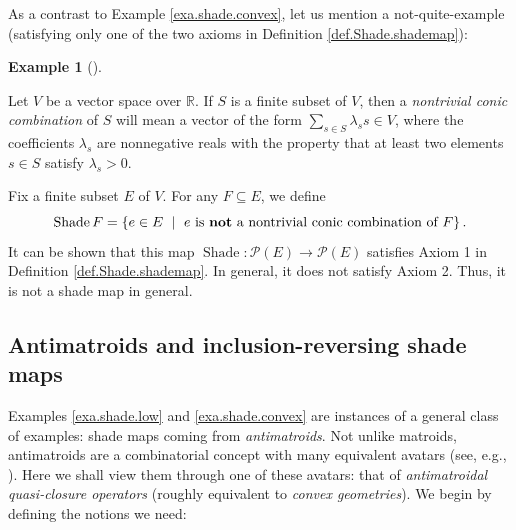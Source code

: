 \documentclass[numbers=enddot,12pt,final,onecolumn]{scrartcl}%
\theoremstyle{definition}
\newtheorem{exam}[theo]{Example}
\newenvironment{example}[1][]
{\begin{exam}[#1]\begin{leftbar}}
{\end{leftbar}\end{exam}}
\let\sumnonlimits\sum
\renewcommand{\sum}{\sumnonlimits\limits}
\begin{document}
As a contrast to Example \ref{exa.shade.convex}, let us mention a
not-quite-example (satisfying only one of the two axioms in
Definition \ref{def.Shade.shademap}):

\begin{example}
\label{exa.shade.cone}Let $V$ be a vector space over $\mathbb{R}$. If $S$ is a
finite subset of $V$, then a \emph{nontrivial conic combination} of $S$ will
mean a vector of the form $\sum_{s\in S}\lambda_{s}s\in V$, where the
coefficients $\lambda_{s}$ are nonnegative reals with the property that at
least two elements $s\in S$ satisfy $\lambda_{s}>0$.

Fix a finite subset $E$ of $V$. For any $F\subseteq E$, we define%
\[
\operatorname*{Shade}F=\left\{  e\in E\ \mid\ e\text{ is \textbf{not} a
nontrivial conic combination of }F\right\}  .
\]
It can be shown that this map $\operatorname*{Shade}:\mathcal{P}\left(
E\right)  \rightarrow\mathcal{P}\left(  E\right)  $ satisfies Axiom 1 in
Definition \ref{def.Shade.shademap}. In general, it does not satisfy Axiom 2.
Thus, it is not a shade map in general.
\end{example}

\subsection{\label{subsect.abstract.amatr}Antimatroids and inclusion-reversing
shade maps}

Examples \ref{exa.shade.low} and \ref{exa.shade.convex} are instances of a
general class of examples: shade maps coming from \emph{antimatroids}. Not
unlike matroids, antimatroids are a combinatorial concept with many equivalent
avatars (see, e.g., \cite[Chapter III]{KoLoSc91}). Here we shall view them
through one of these avatars: that of \emph{antimatroidal quasi-closure
operators} (roughly equivalent to \emph{convex geometries}). We begin by
defining the notions we need:
\end{document}
